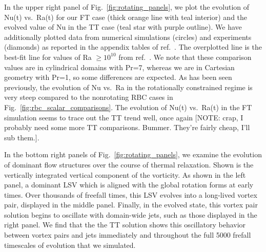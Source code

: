 \documentclass[aps, pre, onecolumn, nofootinbib, notitlepage, groupedaddress, amsfonts, amssymb, amsmath, longbibliography, superscriptaddress]{revtex4-1}
\begin{document}
In the upper right panel of Fig.~\ref{fig:rotating_panels}, we plot the evolution of Nu(t) vs.~Ra(t) for our FT case (thick orange line with teal interior) and the evolved value of Nu in the TT case (teal star with purple outline).
We have additionally plotted data from numerical simulations (circles) and experiments (diamonds) as reported in the appendix tables of ref.~\cite{cheng&all2015}.
The overplotted line is the best-fit line for values of Ra $\geq 10^{10}$ from ref.~\cite{cheng&all2015}.
We note that these comparison values are in cylindrical domains with Pr=7, whereas we are in Cartesian geometry with Pr=1, so some differences are expected.
As has been seen previously, the evolution of Nu vs.~Ra in the rotationally constrained regime is very steep compared to the nonrotating RBC cases in Fig.~\ref{fig:rbc_scalar_comparisons}.
The evolution of Nu(t) vs.~Ra(t) in the FT simulation seems to trace out the TT trend well, once again [NOTE: crap, I probably need some more TT comparisons. Bummer. They're fairly cheap, I'll sub them.].

In the bottom right panels of Fig.~\ref{fig:rotating_panels}, we examine the evolution of dominant flow structures over the course of thermal relaxation.
Shown is the vertically integrated vertical component of the vorticity.
As shown in the left panel, a dominant LSV which is aligned with the global rotation forms at early times.
Over thousands of freefall times, this LSV evolves into a long-lived vortex pair, displayed in the middle panel.
Finally, in the evolved state, this vortex pair solution begins to oscillate with domain-wide jets, such as those displayed in the right panel.
We find that the the TT solution shows this oscillatory behavior between vortex pairs and jets immediately and throughout the full 5000 frefall timescales of evolution that we simulated.
\end{document}
